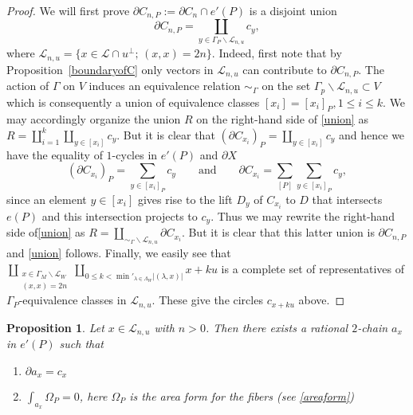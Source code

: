\documentclass[12pt,leqno]{amsart}
\numberwithin{equation}{section}
\theoremstyle{plain}
\newtheorem{proposition}[theorem]{Proposition}
\theoremstyle{definition}
\theoremstyle{remark}
\newcommand{\G}{\Gamma}
\newcommand{\la}{\lambda}
\newcommand{\back}{\backslash}
\newcommand{\calL}{\mathcal{L}}
\begin{document}
\begin{proof}

We will first prove $\partial C_{n,P} := \partial C_n \cap e'(P)$ is a disjoint union
\begin{equation} \label{union}
\partial C_{n,P} = \coprod_{y \in \G_P \back \calL_{n,u}} c_y,
\end{equation}
where $\calL_{n,u} = \{ x \in \calL \cap u^{\perp};\, (x,x)=2n\}$. Indeed, first note that by Proposition~\ref{boundaryofC} only vectors in $\calL_{n,u}$ can contribute to $\partial C_{n,P}$. 
The action of $\Gamma$ on $V$ induces an equivalence relation $\sim_{\Gamma}$ on the set $\G_p \back \calL_{n,u} \subset V$ which is consequently a
union of equivalence classes $[x_i]= [x_i]_P, 1 \leq i \leq k$.  We may accordingly organize the union $R$ on the right-hand side of \eqref{union} as $R =  \coprod _{i=1}^k  \coprod_{ y \in [x_i]} c_y.$
But it is clear that $(\partial C_{x_i})_P = \coprod_{ y \in [x_i]} c_y$ and hence we have the equality of $1$-cycles in $e'(P)$
and $\partial X$
\begin{equation}\label{boundaryofspecialcycle}
(\partial C_{x_i})_P = \sum_{ y \in [x_i]_P} c_y \qquad  \text{and} \qquad  \partial C_{x_i}= \sum_{[P]} \sum_{ y \in [x_i]_P} c_y,
\end{equation}
since an element $y  \in [x_i]$ gives rise to the lift $D_y$ of $C_{x_i}$ to $D$ that intersects
$e(P)$ and this intersection projects to $c_y$.  Thus we may rewrite the right-hand side of\eqref{union} as
$R= \coprod_{  \sim_{\Gamma} \back \calL_{n,u}} \partial C_{x_i}.$
But it is clear that this latter union is $\partial C_{n,P}$ and \eqref{union} follows. Finally, we easily see that $\coprod_{ \substack{x\in \G_M \back \mathcal{L}_W \\ (x,x)=2n}} \coprod_{0 \leq k < \min'_{\la \in \Lambda_W}   |(\la,x)|} x+ku$ is a complete set of representatives of $\G_P$-equivalence classes in $\calL_{n,u}$. These give the circles $c_{x+ku}$ above. 

\end{proof}





\begin{proposition}\label{rat-cap}
Let $x \in \mathcal{L}_{n,u}$ with $n>0$. Then there exists a rational $2$-chain $a_x$ in $e'(P)$ such that
\begin{enumerate}
\item $\partial a_x = c_x$
\item $\int_{a_x} \Omega_P = 0$, here $\Omega_P$ is the area form for the fibers (see \eqref{areaform}) 
\end{enumerate}

\end{proposition}
 
\end{document}
